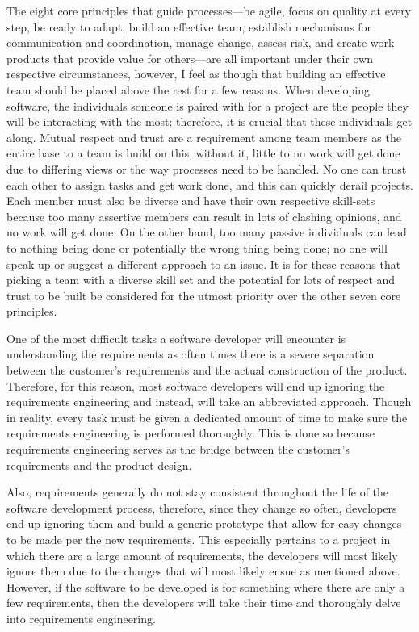 	The eight core principles that guide processes—be agile, focus on quality at every step, be ready to adapt, build an effective team, establish mechanisms for communication and coordination, manage change, assess risk, and create work products that provide value for others—are all important under their own respective circumstances, however, I feel as though that building an effective team should be placed above the rest for a few reasons. When developing software, the individuals someone is paired with for a project are the people they will be interacting with the most; therefore, it is crucial that these individuals get along. Mutual respect and trust are a requirement among team members as the entire base to a team is build on this, without it, little to no work will get done due to differing views or the way processes need to be handled. No one can trust each other to assign tasks and get work done, and this can quickly derail projects. Each member must also be diverse and have their own respective skill-sets because too many assertive members can result in lots of clashing opinions, and no work will get done. On the other hand, too many passive individuals can lead to nothing being done or potentially the wrong thing being done; no one will speak up or suggest a different approach to an issue. It is for these reasons that picking a team with a diverse skill set and the potential for lots of respect and trust to be built be considered for the utmost priority over the other seven core principles.


\newpage
	One of the most difficult tasks a software developer will encounter is understanding the requirements as often times there is a severe separation between the customer's requirements and the actual construction of the product. Therefore, for this reason, most software developers will end up ignoring the requirements engineering and instead, will take an abbreviated approach. Though in reality, every task must be given a dedicated amount of time to make sure the requirements engineering is performed thoroughly. This is done so because requirements engineering serves as the bridge between the customer's requirements and the product design.

	Also, requirements generally do not stay consistent throughout the life of the software development process, therefore, since they change so often, developers end up ignoring them and build a generic prototype that allow for easy changes to be made per the new requirements. This especially pertains to a project in which there are a large amount of requirements, the developers will most likely ignore them due to the changes that will most likely ensue as mentioned above. However, if the software to be developed is for something where there are only a few requirements, then the developers will take their time and thoroughly delve into requirements engineering.


